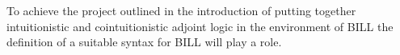 To achieve the project outlined in the introduction of putting together intuitionistic and cointuitionistic adjoint logic 
in the environment of BILL the definition of a suitable syntax for BILL will play a role. 

